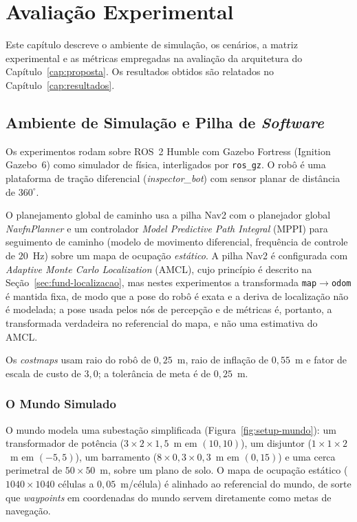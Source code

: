 \chapter{Avaliação Experimental}
\label{cap:avaliacao}

Este capítulo descreve o ambiente de simulação, os cenários, a matriz experimental e
as métricas empregadas na avaliação da arquitetura do Capítulo~\ref{cap:proposta}.
Os resultados obtidos são relatados no Capítulo~\ref{cap:resultados}.

\section{Ambiente de Simulação e Pilha de \textit{Software}}
\label{sec:setup-ambiente}

Os experimentos rodam sobre ROS~2 Humble com Gazebo Fortress (Ignition Gazebo~6)
como simulador de física, interligados por \texttt{ros\_gz}. O robô é uma plataforma
de tração diferencial (\emph{inspector\_bot}) com sensor planar de distância de
$360^\circ$.

O planejamento global de caminho usa a pilha Nav2 com o planejador global
\emph{NavfnPlanner} e um controlador \textit{Model Predictive Path Integral} (MPPI)
para seguimento de caminho (modelo de movimento diferencial, frequência de controle
de $20$~Hz) sobre um mapa de ocupação \emph{estático}. A pilha Nav2 é configurada com
\textit{Adaptive Monte Carlo Localization} (AMCL), cujo princípio é descrito na
Seção~\ref{sec:fund-localizacao}, mas nestes experimentos a
transformada \texttt{map}$\rightarrow$\texttt{odom} é mantida fixa, de modo que a
pose do robô é exata e a deriva de localização não é modelada; a pose usada pelos nós
de percepção e de métricas é, portanto, a transformada verdadeira no referencial do
mapa, e não uma estimativa do AMCL.

Os \textit{costmaps} usam raio do robô de $0{,}25$~m, raio de inflação de $0{,}55$~m
e fator de escala de custo de $3{,}0$; a tolerância de meta é de $0{,}25$~m.

\subsection{O Mundo Simulado}

O mundo modela uma subestação simplificada (Figura~\ref{fig:setup-mundo}): um
transformador de potência ($3{\times}2{\times}1{,}5$~m em $(10,10)$), um disjuntor
($1{\times}1{\times}2$~m em $(-5,5)$), um barramento
($8{\times}0{,}3{\times}0{,}3$~m em $(0,15)$) e uma cerca perimetral de
$50{\times}50$~m, sobre um plano de solo. O mapa de ocupação estático
($1040{\times}1040$ células a $0{,}05$~m/célula) é alinhado ao referencial do mundo,
de sorte que \textit{waypoints} em coordenadas do mundo servem diretamente como metas
de navegação.

